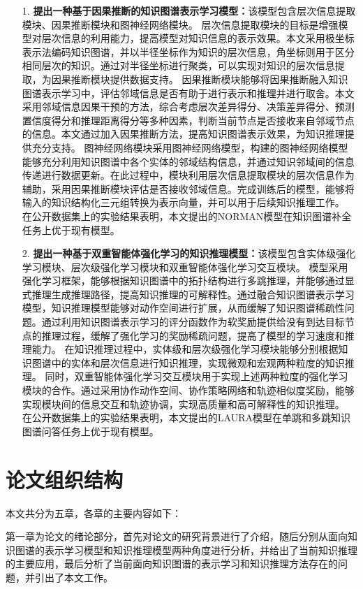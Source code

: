 \documentclass[algorithmlist, AutoFakeBold, AutoFakeSlant, figurelist, tablelist, nomlist, engineering]{seuthesix}
\begin{document}
\begin{itemize}
  \item [1.]\textbf{提出一种基于因果推断的知识图谱表示学习模型：}该模型包含层次信息提取模块、因果推断模块和图神经网络模块。
  层次信息提取模块的目标是增强模型对层次信息的利用能力，提高模型对知识信息的表示效果。本文采用极坐标表示法编码知识图谱，并以半径坐标作为知识的层次信息，角坐标则用于区分相同层次的知识。通过对半径坐标进行聚类，可以实现对知识的层次信息提取，为因果推断模块提供数据支持。
  因果推断模块能够将因果推断融入知识图谱表示学习中，评估邻域信息是否有助于进行表示和推理并进行取舍。本文采用邻域信息因果干预的方法，综合考虑层次差异得分、决策差异得分、预测置信度得分和推理距离得分等多种因素，判断当前节点是否接收来自邻域节点的信息。本文通过加入因果推断方法，提高知识图谱表示效果，为知识推理提供充分支持。
  图神经网络模块采用图神经网络模型，构建的图神经网络模型能够充分利用知识图谱中各个实体的邻域结构信息，并通过知识邻域间的信息传递进行数据更新。在此过程中，模块利用层次信息提取模块的层次信息作为辅助，采用因果推断模块评估是否接收邻域信息。完成训练后的模型，能够将输入的知识结构化三元组转换为表示向量，并可以用于后续知识推理工作。
  在公开数据集上的实验结果表明，本文提出的NORMAN模型在知识图谱补全任务上优于现有模型。
  \item [2.]\textbf{提出一种基于双重智能体强化学习的知识推理模型：}该模型包含实体级强化学习模块、层次级强化学习模块和双重智能体强化学习交互模块。
  模型采用强化学习框架，能够根据知识图谱中的拓扑结构进行多跳推理，并能够通过显式推理生成推理路径，提高知识推理的可解释性。通过融合知识图谱表示学习模型，知识推理模型能够对动作空间进行扩展，从而缓解了知识图谱稀疏性问题。通过利用知识图谱表示学习的评分函数作为软奖励提供给没有到达目标节点的推理过程，缓解了强化学习的奖励稀疏问题，提高了模型的学习速度和推理能力。
  在知识推理过程中，实体级和层次级强化学习模块能够分别根据知识图谱中的实体和层次信息进行知识推理，实现微观和宏观两种粒度的知识推理。
  同时，双重智能体强化学习交互模块用于实现上述两种粒度的强化学习模块的合作。通过采用协作动作空间、协作策略网络和轨迹相似度奖励，能够实现模块间的信息交互和轨迹协调，实现高质量和高可解释性的知识推理。
  在公开数据集上的实验结果表明，本文提出的LAURA模型在单跳和多跳知识图谱问答任务上优于现有模型。
\end{itemize}


\section{论文组织结构}
本文共分为五章，各章的主要内容如下：

第一章为论文的绪论部分，首先对论文的研究背景进行了介绍，随后分别从面向知识图谱的表示学习模型和知识推理模型两种角度进行分析，并给出了当前知识推理的主要应用，最后分析了当前面向知识图谱的表示学习和知识推理方法存在的问题，并引出了本文工作。
\end{document}
